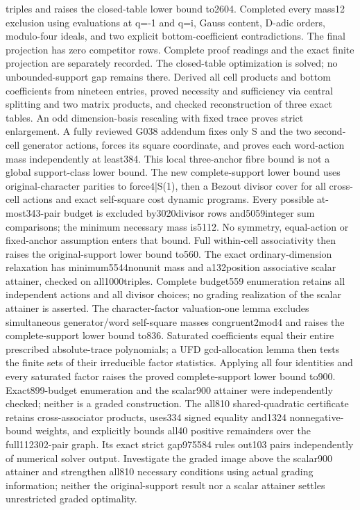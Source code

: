 triples and raises the closed-table lower bound to2604. Completed every mass12 exclusion using evaluations at q=-1 and q=i, Gauss content, D-adic orders, modulo-four ideals, and two explicit bottom-coefficient contradictions. The final projection has zero competitor rows. Complete proof readings and the exact finite projection are separately recorded. The closed-table optimization is solved; no unbounded-support gap remains there. Derived all cell products and bottom coefficients from nineteen entries, proved necessity and sufficiency via central splitting and two matrix products, and checked reconstruction of three exact tables. An odd dimension-basis rescaling with fixed trace proves strict enlargement. A fully reviewed G038 addendum fixes only S and the two second-cell generator actions, forces its square coordinate, and proves each word-action mass independently at least384. This local three-anchor fibre bound is not a global support-class lower bound. The new complete-support lower bound uses original-character parities to force4|S(1), then a Bezout divisor cover for all cross-cell actions and exact self-square cost dynamic programs. Every possible at-most343-pair budget is excluded by3020divisor rows and5059integer sum comparisons; the minimum necessary mass is5112. No symmetry, equal-action or fixed-anchor assumption enters that bound. Full within-cell associativity then raises the original-support lower bound to560. The exact ordinary-dimension relaxation has minimum5544nonunit mass and a132position associative scalar attainer, checked on all1000triples. Complete budget559 enumeration retains all independent actions and all divisor choices; no grading realization of the scalar attainer is asserted. The character-factor valuation-one lemma excludes simultaneous generator/word self-square masses congruent2mod4 and raises the complete-support lower bound to836. Saturated coefficients equal their entire prescribed absolute-trace polynomials; a UFD gcd-allocation lemma then tests the finite sets of their irreducible factor statistics. Applying all four identities and every saturated factor raises the proved complete-support lower bound to900. Exact899-budget enumeration and the scalar900 attainer were independently checked; neither is a graded construction. The all810 shared-quadratic certificate retains cross-associator products, uses334 signed equality and1324 nonnegative-bound weights, and explicitly bounds all40 positive remainders over the full112302-pair graph. Its exact strict gap975584 rules out103 pairs independently of numerical solver output. Investigate the graded image above the scalar900 attainer and strengthen all810 necessary conditions using actual grading information; neither the original-support result nor a scalar attainer settles unrestricted graded optimality.
